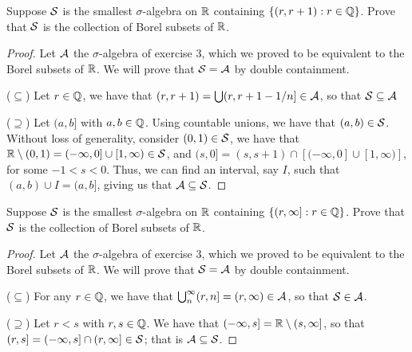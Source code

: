 \begin{exercise}{5}
Suppose $\mathcal{S}$ is the smallest $\sigma$-algebra on $\mathbb{R}$ containing $\{(r,r+1): r \in \mathbb{Q}\}$.
Prove that $\mathcal{S}$ is the collection of Borel subsets of $\mathbb{R}$.
\end{exercise}
\begin{proof}
Let $\mathcal{A}$ the $\sigma$-algebra of exercise 3, which we proved to be equivalent to the Borel subsets of $\mathbb{R}$.
We will prove that $\mathcal{S} = \mathcal{A}$ by double containment.

($\subseteq$)
Let $r\in\mathbb{Q}$, we have that $(r,r+1) = \bigcup (r, r+1-1/n] \in \mathcal{A}$, so that $\mathcal{S} \subseteq \mathcal{A}$

($\supseteq$)
Let $(a,b]$ with $a,b\in\mathbb{Q}$.
Using countable unions, we have that $(a,b) \in \mathcal{S}$.
Without loss of generality, consider $(0,1) \in \mathcal{S}$, we have that $\mathbb{R} \setminus (0,1) = (-\infty, 0] \cup [1,\infty) \in \mathcal{S}$, and $(s,0] = (s,s+1) \cap [(-\infty, 0] \cup [1,\infty)]$, for some $-1<s<0$.
Thus, we can find an interval, say $I$, such that $(a,b) \cup I = (a,b]$, giving us that $\mathcal{A} \subseteq \mathcal{S}$.
\end{proof} 

\begin{exercise}{6}
Suppose $\mathcal{S}$ is the smallest $\sigma$-algebra on $\mathbb{R}$ containing $\{(r,\infty]: r \in \mathbb{Q}\}$.
Prove that $\mathcal{S}$ is the collection of Borel subsets of $\mathbb{R}$.
\end{exercise}
\begin{proof}
Let $\mathcal{A}$ the $\sigma$-algebra of exercise 3, which we proved to be equivalent to the Borel subsets of $\mathbb{R}$.
We will prove that $\mathcal{S} = \mathcal{A}$ by double containment.

($\subseteq$)
For any $r\in\mathbb{Q}$, we have that $\bigcup_n^\infty (r, n] = (r,\infty) \in \mathcal{A}$, so that $\mathcal{S} \in \mathcal{A}$.

($\supseteq$)
Let $r<s$ with $r,s\in\mathbb{Q}$.
We have that $(-\infty, s] = \mathbb{R} \setminus (s,\infty]$, so that $(r,s] = (-\infty, s] \cap (r,\infty] \in \mathcal{S}$;
that is $\mathcal{A} \subseteq \mathcal{S}$.
\end{proof} 

